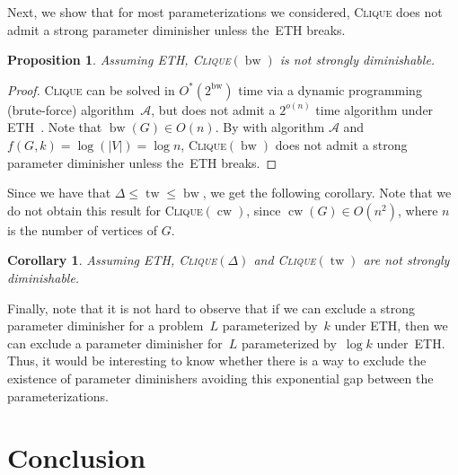 \documentclass[11pt,a4,USenglish]{article}
\newcommand{\prob}[1]{\textsc{#1}}
\newcommand{\pprob}[2]{\prob{#1}$(#2)$}
\newcommand{\ETH}{\textnormal{ETH}}
\DeclareMathOperator{\tw}{tw}
\DeclareMathOperator{\bw}{bw}
\DeclareMathOperator{\cw}{cw}
\theoremstyle{definition}
\theoremstyle{plain}
\newtheorem{corollary}{Corollary}
\newtheorem{proposition}{Proposition}
\theoremstyle{remark}
\newcommand{\calA}{\mathcal{A}}
\begin{document}
%
{
%

  

  Next, we show that for most parameterizations we considered, \prob{Clique} does not admit a strong parameter diminisher unless the~\ETH{} breaks. 

  \begin{proposition}%
  \label{prop:ethcliquebw}
  Assuming \ETH{}, \pprob{Clique}{\bw} 
%
  is 
%
  not strongly diminishable.
  \end{proposition}

  {
    \begin{proof}
%
%
%
%
%
%
%
      \prob{Clique} can be solved in $O^*(2^{\bw})$ time via a dynamic programming (brute-force) algorithm~$\calA$, but does not admit a $2^{o(n)}$ time algorithm under \ETH{}~\cite{lokshtanov2011lower}. Note that $\bw(G)\in O(n)$.
      By  with algorithm $\calA$ and $f(G, k)=\log(|V|)=\log n$, \pprob{Clique}{\bw} does not admit a strong parameter diminisher unless the~\ETH{} breaks. %
%
    \end{proof}
  }

  Since we have that $\Delta \le \tw \le \bw$, we get the following corollary. Note that we do not obtain this result for \pprob{Clique}{\cw}, since $\cw(G)\in O(n^2)$, where $n$ is the number of vertices of $G$.
  \begin{corollary}
  Assuming \ETH{}, \pprob{Clique}{\Delta} and \pprob{Clique}{\tw} are not strongly diminishable.
  \end{corollary}

%
%
%
%
%
%
%
%
%
%
%
%
%
%
%
%
%
%
%
%
%
%
%

%
%
%
%
%
%
%
%
%
%
%
%
%
%
%
%
%
%
%
%
%
%
%
%
%
%
%
%
%
%
%
%
%
%
}
%
%
%
%
%
%
%
%
%
%
%
%
%
%
%
%
%
%
%
%
%
%
%
%
%
%
%
%
%


%
%
%
%
%
%
%

\iflong{}%
Finally, note that it is not hard to observe that 
if we can exclude a strong parameter diminisher for a problem~$L$ parameterized by~$k$ under ETH, 
then we can exclude a parameter diminisher for~$L$ parameterized by~$\log k$ under~ETH.
Thus, it would be interesting to know whether there is a way to 
exclude the existence of parameter diminishers avoiding this exponential gap between the 
parameterizations.
\fi{}

\section{Conclusion}
\label{sec:conclusion}
%
%
%
\end{document}
